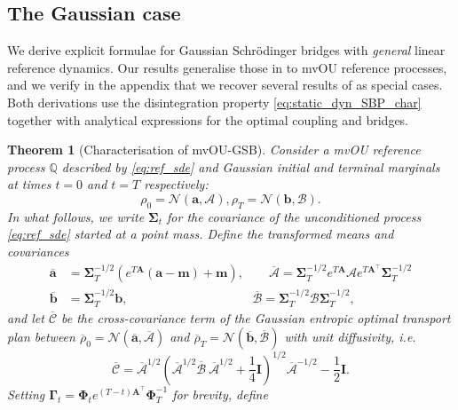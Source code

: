 \documentclass{article}
\newcommand{\Nc}{\mathcal{N}}
\newcommand{\Ac}{\mathcal{A}}
\newcommand{\Bc}{\mathcal{B}}
\newcommand{\Cc}{\mathcal{C}}
\theoremstyle{newstyle}
\newtheorem{thm}{Theorem}
\begin{document}
\subsection{The Gaussian case}\label{sec:mvOU_GSB}

We derive explicit formulae for Gaussian Schr\"odinger bridges with \emph{general} linear reference dynamics. Our results generalise those in \cite{bunne2023schrodinger} to mvOU reference processes, and we verify in the appendix that we recover several results of \cite[Theorem 3, Table 1]{bunne2023schrodinger} as special cases. Both derivations use the disintegration property \eqref{eq:static_dyn_SBP_char} together with analytical expressions for the optimal coupling and bridges. 

\begin{thm}[Characterisation of mvOU-GSB]\label{thm:ou_gsb}
  Consider a mvOU reference process $\mathbb{Q}$ described by \eqref{eq:ref_sde} and Gaussian initial and terminal marginals at times $t = 0$ and $t = T$ respectively:
  \[
    \rho_0 = \Nc(\bm{a}, \bm{\Ac}), \rho_T = \Nc(\bm{b}, \bm{\Bc}).
  \]
  In what follows, we write $\bm{\Sigma}_t$ for the covariance of the \emph{unconditioned} process \eqref{eq:ref_sde} started at a point mass. 
  Define the \emph{transformed} means and covariances 
  \begin{align*}
    \overline{\bm{a}} &= \bm{\Sigma}_T^{-1/2} (e^{T\bm{A}}(\bm{a} - \bm{m}) + \bm{m}), \qquad \overline{\bm{\Ac}} = \bm{\Sigma}_T^{-1/2} e^{T\bm{A}} \bm{\Ac} e^{T\bm{A}^\top} \bm{\Sigma}_T^{-1/2} \\
    \overline{\bm{b}} &= \bm{\Sigma}_T^{-1/2} \bm{b}, \qquad\qquad\qquad\qquad\qquad \overline{\bm{\Bc}} = \bm{\Sigma}_T^{-1/2} \bm{\Bc} \bm{\Sigma}_T^{-1/2},
  \end{align*}
  and let $\bm{\overline{\Cc}}$ be the cross-covariance term of the Gaussian entropic optimal transport plan \cite[Theorem 1]{janati2021advances} between $\overline{\rho}_0 = \Nc(\overline{\bm{a}}, \overline{\bm{\Ac}})$ and $\overline{\rho}_T = \Nc(\overline{\bm{b}}, \overline{\bm{\Bc}})$ with unit diffusivity, i.e.
  \begin{equation}
    \overline{\bm{\Cc}} = {\textstyle \overline{\bm{\Ac}}^{1/2} \left( \overline{\bm{\Ac}}^{1/2} \overline{\bm{\Bc}} \: \overline{\bm{\Ac}}^{1/2} + \frac{1}{4} \bm{I} \right)^{1/2} \overline{\bm{\Ac}}^{-1/2} - \frac{1}{2} \bm{I}}.
  \end{equation}
  Setting $\bm{\Gamma}_t = \bm{\Phi}_t e^{(T-t)\bm{A}^\top} \bm{\Phi}_T^{-1}$ for brevity, define 
  \begin{align}

\end{align}
\end{thm}
\end{document}
